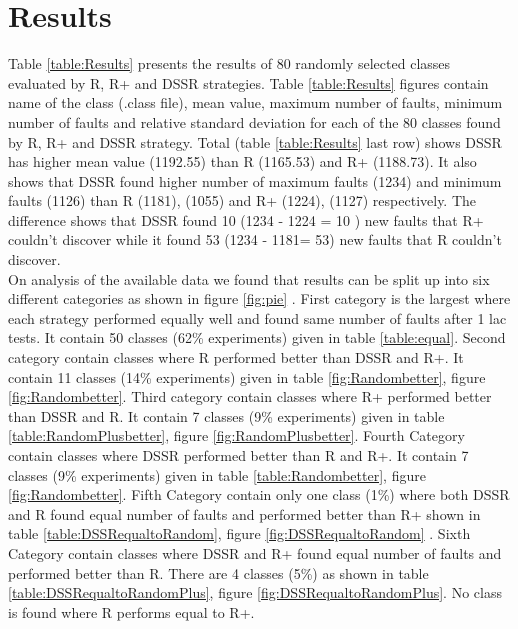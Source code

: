 \documentclass[conference]{IEEEtran}
\begin{document}

\section{Results}\label{sec:res}

Table \ref{table:Results} presents the results of 80 randomly selected classes evaluated by R, R+ and DSSR strategies. Table \ref{table:Results} figures contain name of the class (.class file), mean value, maximum number of faults, minimum number of faults and relative standard deviation for each of the 80 classes found by R, R+ and DSSR strategy. Total (table \ref{table:Results} last row) shows DSSR has higher mean value (1192.55) than R (1165.53) and R+ (1188.73). It also shows that DSSR found higher number of maximum faults (1234) and minimum faults (1126) than R (1181), (1055) and R+ (1224), (1127) respectively. The difference shows that DSSR found 10 (1234 - 1224 = 10 ) new faults that R+ couldn't discover while it found 53 (1234 - 1181= 53) new faults that R couldn't discover.\\
On analysis of the available data we found that results can be split up into six different categories as shown in figure \ref{fig:pie} . First category is the largest where each strategy performed equally well and found same number of faults after 1 lac tests. It contain 50 classes (62\% experiments) given in table \ref{table:equal}. Second category contain classes where R performed better than DSSR and R+. It contain 11 classes (14\% experiments) given in table \ref{fig:Randombetter}, figure \ref{fig:Randombetter}. Third category contain classes where R+ performed better than DSSR and R. It contain 7 classes (9\% experiments) given in table \ref{table:RandomPlusbetter}, figure \ref{fig:RandomPlusbetter}. Fourth Category contain classes where DSSR performed better than R and R+. It contain 7 classes (9\% experiments) given in table \ref{table:Randombetter}, figure \ref{fig:Randombetter}. Fifth Category contain only one class (1\%) where both DSSR and R found equal number of faults and performed better than R+ shown in table \ref{table:DSSRequaltoRandom}, figure \ref{fig:DSSRequaltoRandom} . Sixth Category contain classes where DSSR and R+ found equal number of faults and performed better than R. There are 4 classes (5\%) as shown in table \ref{table:DSSRequaltoRandomPlus}, figure \ref{fig:DSSRequaltoRandomPlus}. No class is found where R performs equal to R+.\\ 
\end{document}
